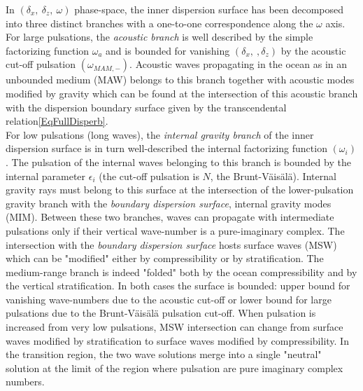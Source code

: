 \documentclass[a4paper,11pt]{article}
\begin{document}
In $(\delta_x,\ \delta_z,\ \omega)$ phase-space, the inner dispersion surface has been decomposed into three distinct branches with a one-to-one correspondence along the $\omega$ axis. For large pulsations, the \textit{acoustic branch} is well described by the simple factorizing function $\omega_a$ and is bounded for vanishing $(\delta_x,\ ,\delta_z)$ by the acoustic cut-off pulsation $(\omega_{MAM,-})$. Acoustic waves propagating in the ocean as in an unbounded medium (MAW) belongs to this branch together with acoustic modes modified by gravity which can be found at the intersection of this acoustic branch with the dispersion boundary surface given by the transcendental relation\ref{EqFullDisperb}.\\
For low pulsations (long waves), the \textit{internal gravity branch} of the inner dispersion surface is in turn well-described the internal factorizing function $(\omega_i)$. The pulsation of the internal waves belonging to this branch is bounded by the internal parameter $\epsilon_i$ (the cut-off pulsation is $N$, the Brunt-Väisälä). Internal gravity rays must belong to this surface at the intersection of the lower-pulsation gravity branch with the \textit{boundary dispersion surface}, internal gravity modes (MIM). Between these two branches, waves can propagate with intermediate pulsations  only if their vertical wave-number is a pure-imaginary complex. The intersection with the \textit{boundary dispersion surface} hosts surface waves (MSW) which can be "modified" either by compressibility or by stratification. The medium-range branch is indeed "folded" both by the ocean compressibility and by the vertical stratification. In both cases the surface is bounded: upper bound for vanishing wave-numbers due to the acoustic cut-off or lower bound for large pulsations due to the Brunt-Väisälä pulsation cut-off. When pulsation is increased from very low pulsations, MSW intersection can change from surface waves modified by stratification to surface waves modified by compressibility. In the transition region, the two wave solutions merge into a single "neutral" solution at the limit of the region where pulsation are pure imaginary complex numbers.
\end{document}
